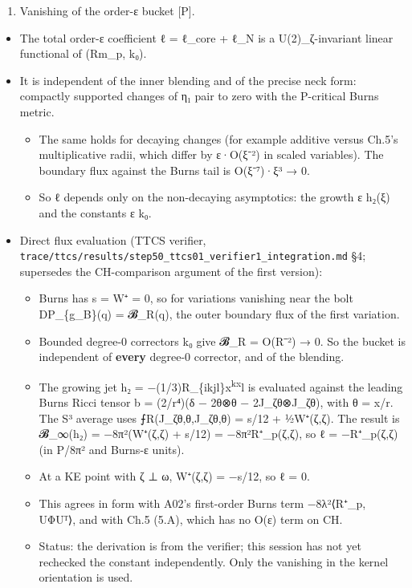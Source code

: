 \documentclass[
  10pt,
]{report}
\providecommand{\tightlist}{%
  \setlength{\itemsep}{0pt}\setlength{\parskip}{0pt}}
\begin{document}
\begin{enumerate}
\def\labelenumi{(\Alph{enumi})}
\setcounter{enumi}{2}
\tightlist
\item
  Vanishing of the order-ε bucket {[}P{]}.
\end{enumerate}

\begin{itemize}
\tightlist
\item
  The total order-ε coefficient ℓ = ℓ\_core + ℓ\_N is a
  U(2)\_ζ-invariant linear functional of (Rm\_p, k₀).
\item
  It is independent of the inner blending and of the precise neck form:
  compactly supported changes of η₁ pair to zero with the P-critical
  Burns metric.

  \begin{itemize}
  \tightlist
  \item
    The same holds for decaying changes (for example additive versus
    Ch.5's multiplicative radii, which differ by
    ε·O(\textbar ξ\textbar⁻²) in scaled variables). The boundary flux
    against the Burns tail is
    O(\textbar ξ\textbar⁻⁷)·\textbar ξ\textbar³ → 0.
  \item
    So ℓ depends only on the non-decaying asymptotics: the growth ε
    h₂(ξ) and the constants ε k₀.
  \end{itemize}
\item
  Direct flux evaluation (TTCS verifier,
  \texttt{trace/ttcs/results/step50\_ttcs01\_verifier1\_integration.md}
  §4; supersedes the CH-comparison argument of the first version):

  \begin{itemize}
  \tightlist
  \item
    Burns has s = W⁺ = 0, so for variations vanishing near the bolt
    DP\_\{g\_B\}(q) = 𝓑\_R(q), the outer boundary flux of the first
    variation.
  \item
    Bounded degree-0 correctors k₀ give 𝓑\_R = O(R⁻²) → 0. So the bucket
    is independent of \textbf{every} degree-0 corrector, and of the
    blending.
  \item
    The growing jet h₂ = −(1/3)R\_\{ikjl\}x\textsuperscript{kx}l is
    evaluated against the leading Burns Ricci tensor b = (2/r⁴)(δ − 2θ⊗θ
    − 2J\_ζθ⊗J\_ζθ), with θ = x/r. The S³ average uses
    ⨍R(J\_ζθ,θ,J\_ζθ,θ) = s/12 + ½W⁺(ζ,ζ). The result is 𝓑\_∞(h₂) =
    −8π²(W⁺(ζ,ζ) + s/12) = −8π²R⁺\_p(ζ,ζ), so ℓ = −R⁺\_p(ζ,ζ) (in P/8π²
    and Burns-ε units).
  \item
    At a KE point with ζ ⊥ ω, W⁺(ζ,ζ) = −s/12, so ℓ = 0.
  \item
    This agrees in form with A02's first-order Burns term −8λ²⟨R⁺\_p,
    UΦUᵀ⟩, and with Ch.5 (5.A), which has no O(ε) term on CH.
  \item
    Status: the derivation is from the verifier; this session has not
    yet rechecked the constant independently. Only the vanishing in the
    kernel orientation is used.
  \end{itemize}
\end{itemize}
\end{document}
